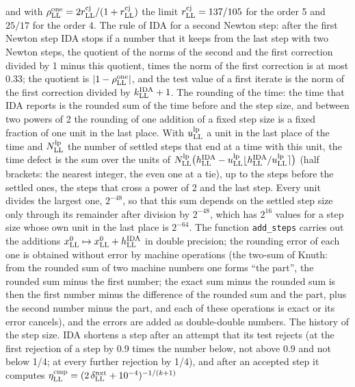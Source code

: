 \documentclass[
  10pt,
]{article}
\begin{document}
\begin{itemize}
  and with
  \(\rho^{\rm one}_{\rm LL}=2r^{\rm cj}_{\rm LL}/(1+r^{\rm cj}_{\rm LL})\)
  the limit \(r^{\rm cj}_{\rm LL}=137/105\) for the order 5 and
  \(25/17\) for the order 4. The rule of IDA for a second Newton step:
  after the first Newton step IDA stops if a number that it keeps from
  the last step with two Newton steps, the quotient of the norms of the
  second and the first correction divided by 1 minus this quotient,
  times the norm of the first correction is at most 0.33; the quotient
  is \(\lvert1-\rho^{\rm one}_{\rm LL}\rvert\), and the test value of a
  first iterate is the norm of the first correction divided by
  \(k^{\rm IDA}_{\rm LL}+1\). The rounding of the time: the time that
  IDA reports is the rounded sum of the time before and the step size,
  and between two powers of 2 the rounding of one addition of a fixed
  step size is a fixed fraction of one unit in the last place. With
  \(u^{\rm lp}_{\rm LL}\) a unit in the last place of the time and
  \(N^{\rm lp}_{\rm LL}\) the number of settled steps that end at a time
  with this unit, the time defect is the sum over the units of
  \(N^{\rm lp}_{\rm LL}\big(h^{\rm IDA}_{\rm LL}-u^{\rm lp}_{\rm LL}\lfloor h^{\rm IDA}_{\rm LL}/u^{\rm lp}_{\rm LL}\rceil\big)\)
  (half brackets: the nearest integer, the even one at a tie), up to the
  steps before the settled ones, the steps that cross a power of 2 and
  the last step. Every unit divides the largest one, \(2^{-48}\), so
  that this sum depends on the settled step size only through its
  remainder after division by \(2^{-48}\), which has \(2^{16}\) values
  for a step size whose own unit in the last place is \(2^{-64}\). The
  function \texttt{add\_steps} carries out the additions
  \(x^0_{\rm LL}\mapsto x^0_{\rm LL}+h^{\rm IDA}_{\rm LL}\) in double
  precision; the rounding error of each one is obtained without error by
  machine operations (the two-sum of Knuth: from the rounded sum of two
  machine numbers one forms ``the part'', the rounded sum minus the
  first number; the exact sum minus the rounded sum is then the first
  number minus the difference of the rounded sum and the part, plus the
  second number minus the part, and each of these operations is exact or
  its error cancels), and the errors are added as double-double numbers.
  The history of the step size. IDA shortens a step after an attempt
  that its test rejects (at the first rejection of a step by 0.9 times
  the number below, not above 0.9 and not below 1/4; at every further
  rejection by 1/4), and after an accepted step it computes
  \(\eta^{\rm cmp}_{\rm LL}=(2\,\delta^{\rm nxt}_{\rm LL}+10^{-4})^{-1/(k+1)}\)

\end{itemize}
\end{document}

